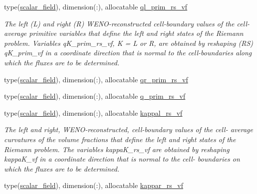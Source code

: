 \begin{DoxyCompactItemize}
\item 
type(\hyperlink{structm__derived__types_1_1scalar__field}{scalar\+\_\+field}), dimension(\+:), allocatable \hyperlink{namespacem__riemann__solvers_aa4fd04af7adfbb38e425f6e91e041ecc}{ql\+\_\+prim\+\_\+rs\+\_\+vf}
\begin{DoxyCompactList}\small\item\em The left (L) and right (R) W\+E\+N\+O-\/reconstructed cell-\/boundary values of the cell-\/average primitive variables that define the left and right states of the Riemann problem. Variables q\+K\+\_\+prim\+\_\+rs\+\_\+vf, K = L or R, are obtained by reshaping (RS) q\+K\+\_\+prim\+\_\+vf in a coordinate direction that is normal to the cell-\/boundaries along which the fluxes are to be determined. \end{DoxyCompactList}\item 
type(\hyperlink{structm__derived__types_1_1scalar__field}{scalar\+\_\+field}), dimension(\+:), allocatable \hyperlink{namespacem__riemann__solvers_a70fefa4f5849fa4c952030b0ac04482a}{qr\+\_\+prim\+\_\+rs\+\_\+vf}
\item 
type(\hyperlink{structm__derived__types_1_1scalar__field}{scalar\+\_\+field}), dimension(\+:), allocatable \hyperlink{namespacem__riemann__solvers_afe077d6837688601705ac13df3d9c3dc}{q\+\_\+prim\+\_\+rs\+\_\+vf}
\end{DoxyCompactItemize}

\textbf{ }\par
\begin{DoxyCompactItemize}
\item 
type(\hyperlink{structm__derived__types_1_1scalar__field}{scalar\+\_\+field}), dimension(\+:), allocatable \hyperlink{namespacem__riemann__solvers_ac277f9426d7112e2b42fdc0fd6583f5e}{kappal\+\_\+rs\+\_\+vf}
\begin{DoxyCompactList}\small\item\em The left and right, W\+E\+N\+O-\/reconstructed, cell-\/boundary values of the cell-\/ average curvatures of the volume fractions that define the left and right states of the Riemann problem. The variables kappa\+K\+\_\+rs\+\_\+vf are obtained by reshaping kappa\+K\+\_\+vf in a coordinate direction that is normal to the cell-\/ boundaries on which the fluxes are to be determined. \end{DoxyCompactList}\item 
type(\hyperlink{structm__derived__types_1_1scalar__field}{scalar\+\_\+field}), dimension(\+:), allocatable \hyperlink{namespacem__riemann__solvers_ae8a2bf891d899a2441210a29da0e03a1}{kappar\+\_\+rs\+\_\+vf}
\end{DoxyCompactItemize}

